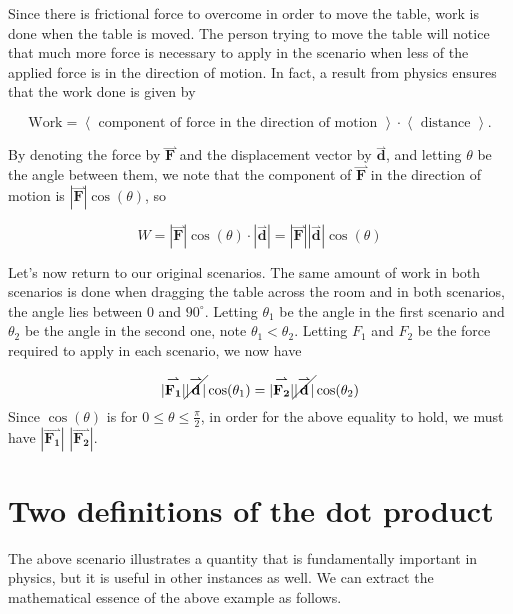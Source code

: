 \documentclass{ximera}
\begin{document}
\begin{model}
Since there is frictional force to overcome in order to move the table, work is done when the table is moved.  The person trying to move the table will notice that much more force is necessary to apply in the scenario when less of the applied force is in the direction of motion.  In fact, a result from physics ensures that the work done is given by

\[
\textrm{Work} = \left<\textrm{ component of force in the direction of motion }\right> \cdot \left<\textrm{ distance }\right>.
\]

By denoting the force by $\overset{\boldsymbol{\rightharpoonup}}{\mathbf{F}}$ and the displacement vector by $\overset{\boldsymbol{\rightharpoonup}}{\mathbf{d}}$, and letting $\theta$ be the angle between them, we note that the component of $\overset{\boldsymbol{\rightharpoonup}}{\mathbf{F}}$ in the direction of motion is $|\overset{\boldsymbol{\rightharpoonup}}{\mathbf{F}}|\cos(\theta)$, so 

\[
W = |\overset{\boldsymbol{\rightharpoonup}}{\mathbf{F}}| \cos(\theta) \cdot |\overset{\boldsymbol{\rightharpoonup}}{\mathbf{d}}| = |\overset{\boldsymbol{\rightharpoonup}}{\mathbf{F}}||\overset{\boldsymbol{\rightharpoonup}}{\mathbf{d}}|\cos(\theta)
\]

Let's now return to our original scenarios.  The same amount of work in both scenarios is done when dragging the table across the room and in both scenarios, the angle lies between $0$ and $90^{\circ}$.  Letting $\theta_1$ be the angle in the first scenario and $\theta_2$ be the angle in the second one, note $\theta_1 <\theta_2$.  Letting $F_1$ and $F_2$ be the force required to apply in each scenario, we now have 

\[
|\overset{\boldsymbol{\rightharpoonup}}{\mathbf{F_1}}|\cancel{|\overset{\boldsymbol{\rightharpoonup}}{\mathbf{d}}|}\cos(\theta_1) = |\overset{\boldsymbol{\rightharpoonup}}{\mathbf{F_2}}|\cancel{|\overset{\boldsymbol{\rightharpoonup}}{\mathbf{d}}|}\cos(\theta_2)
\]
Since $\cos(\theta)$ is  for $0\leq \theta\leq \frac{\pi}{2}$, in order for the above equality to hold,  we must have $|\overset{\boldsymbol{\rightharpoonup}}{\mathbf{F_1}}|$ \wordChoice{\choice[correct]{$<$}\choice{$=$}\choice{$>$}} $|\overset{\boldsymbol{\rightharpoonup}}{\mathbf{F_2}}|$.
\end{model}



\section{Two definitions of the dot product}
The above scenario illustrates a quantity that is fundamentally important in physics, but it is useful in other instances as well.  We can extract the mathematical essence of the above example as follows.  
\end{document}
